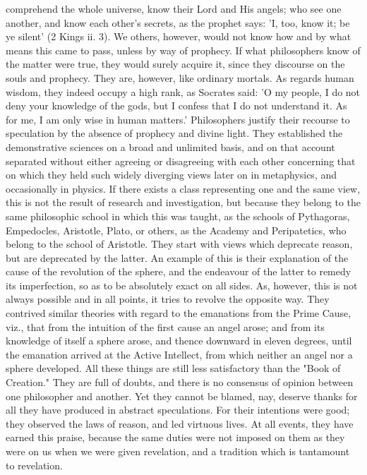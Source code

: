 \documentclass[12pt]{article}
\begin{document}
comprehend the whole universe, know their Lord and His angels; who see one another, and know each other's secrets, as the prophet says: 'I, too, know it; be ye silent' (2 Kings ii. 3). We others, however, would not know how and by what means this came to pass, unless by way of prophecy. If what philosophers know of the matter were true, they would surely acquire it, since they discourse on the souls and prophecy. They are, however, like ordinary mortals. As regards human wisdom, they indeed occupy a high rank, as Socrates said: 'O my people, I do not deny your knowledge of the gods, but I confess that I do not understand it. As for me, I am only wise in human matters.' Philosophers justify their recourse to speculation by the absence of prophecy and divine light. They established the demonstrative sciences on a broad and unlimited basis, and on that account separated without either agreeing or disagreeing with each other concerning that on which they held such widely diverging views later on in metaphysics, and occasionally in physics. If there exists a class representing one and the same view, this is not the result of research and investigation, but because they belong to the same philosophic school in which this was taught, as the schools of Pythagoras, Empedocles, Aristotle, Plato, or others, as the Academy and Peripatetics, who belong to the school of Aristotle. They start with views which deprecate reason, but are deprecated by the latter. An example of this is their explanation of the cause of the revolution of the sphere, and the endeavour of the latter to remedy its imperfection, so as to be absolutely exact on all sides. As, however, this is not always possible and in all points, it tries to revolve the opposite way. They contrived similar theories with regard to the emanations from the Prime Cause, viz., that from the intuition of the first cause an angel arose; and from its knowledge of itself a sphere arose, and thence downward in eleven degrees, until the emanation arrived at the Active Intellect, from which neither an angel nor a sphere developed. All these things are still less satisfactory than the "Book of Creation." They are full of doubts, and there is no consensus of opinion between one philosopher and another. Yet they cannot be blamed, nay, deserve thanks for all they have produced in abstract speculations. For their intentions were good; they observed the laws of reason, and led virtuous lives. At all events, they have earned this praise, because the same duties were not imposed on them as they were on us when we were given revelation, and a tradition which is tantamount to revelation.
\end{document}

